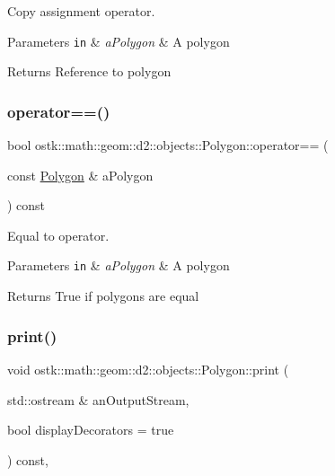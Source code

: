 Copy assignment operator. 


\begin{DoxyParams}[1]{Parameters}
\mbox{\tt in}  & {\em a\+Polygon} & A polygon \\
\hline
\end{DoxyParams}
\begin{DoxyReturn}{Returns}
Reference to polygon 
\end{DoxyReturn}
\mbox{\label{classostk_1_1math_1_1geom_1_1d2_1_1objects_1_1_polygon_a6fa3a2d3811523250bbb916e5d0ff8b9}} 
\subsubsection{\texorpdfstring{operator==()}{operator==()}}
{\footnotesize\ttfamily bool ostk\+::math\+::geom\+::d2\+::objects\+::\+Polygon\+::operator== (\begin{DoxyParamCaption}\item[{const \hyperlink{classostk_1_1math_1_1geom_1_1d2_1_1objects_1_1_polygon}{Polygon} \&}]{a\+Polygon }\end{DoxyParamCaption}) const}



Equal to operator. 


\begin{DoxyParams}[1]{Parameters}
\mbox{\tt in}  & {\em a\+Polygon} & A polygon \\
\hline
\end{DoxyParams}
\begin{DoxyReturn}{Returns}
True if polygons are equal 
\end{DoxyReturn}
\mbox{\label{classostk_1_1math_1_1geom_1_1d2_1_1objects_1_1_polygon_adbf6ed9930a6dd2f3eab1c5c1b256ded}} 
\subsubsection{\texorpdfstring{print()}{print()}}
{\footnotesize\ttfamily void ostk\+::math\+::geom\+::d2\+::objects\+::\+Polygon\+::print (\begin{DoxyParamCaption}\item[{std\+::ostream \&}]{an\+Output\+Stream,  }\item[{bool}]{display\+Decorators = {\ttfamily true} }\end{DoxyParamCaption}) const\hspace{0.3cm}{\ttfamily [override]}, {\ttfamily [virtual]}}



